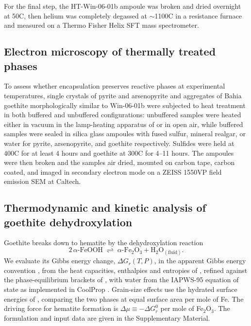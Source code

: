 For the final step, the HT-Win-06-01b ampoule was broken and dried overnight at 50\textdegree C, then helium was completely degassed at $\sim$1100\textdegree C in a resistance furnace and measured on a Thermo Fisher Helix SFT mass spectrometer. 
\subsection{Electron microscopy of thermally treated phases}\label{sec:methods-sem}

To assess whether encapsulation preserves reactive phases at experimental temperatures, single crystals of pyrite and arsenopyrite and aggregates of Bahia goethite morphologically similar to Win-06-01b \citep{shustervasconcelos2005,monteiro2017} were subjected to heat treatment in both buffered and unbuffered configurations: unbuffered samples were heated either in vacuum in the lamp-heating apparatus of \citet{farley1999} or in open air, while buffered samples were sealed in silica glass ampoules with fused sulfur, mineral realgar, or water for pyrite, arsenopyrite, and goethite respectively. Sulfides were held at 400\textdegree C for at least 4 hours and goethite at 300\textdegree C for 4--11 hours. The ampoules were then broken and the samples air dried, mounted on carbon tape, carbon coated, and imaged in secondary electron mode on a ZEISS 1550VP field emission SEM at Caltech.


\subsection{Thermodynamic and kinetic analysis of goethite dehydroxylation}\label{sec:methods-kinetics}

Goethite breaks down to hematite by the dehydroxylation reaction
\begin{equation}
  2\,\alpha\text{-FeOOH} \;\rightleftharpoons\; \alpha\text{-Fe}_2\text{O}_3 + \text{H}_2\text{O}_{(\text{fluid})} .
  \label{eq:gt_rxn}
\end{equation}
We evaluate its Gibbs energy change, $\Delta G_r(T,P)$, in the apparent Gibbs energy convention
\citep{berman1988}, from the heat capacities, enthalpies and
entropies of \citet{majzlan2003a,majzlan2003}, refined against the phase-equilibrium brackets of
\citet{voigt1981}, with water from the IAPWS-95 equation of state \citep{wagner2002} as implemented
in CoolProp \citep{bell2014}. Grain-size effects use the hydrated surface energies of
\citet{navrotsky2008}, comparing the two phases at equal surface area per mole of Fe. The
driving force for hematite formation is $\Delta\mu \equiv -\Delta G_r^{0}$ per mole of
Fe$_2$O$_3$. The formulation and input data are given in the Supplementary Material.

